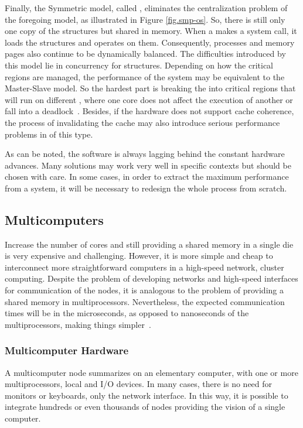 			Finally, the Symmetric model, called \smp, eliminates the centralization
			problem of the foregoing model, as illustrated in Figure \ref{fig.smp-os}.
			So, there is still only one copy of the \os structures but shared in memory.
			When a \cpu makes a system call, it loads the structures and operates on them.
			Consequently, processes and memory pages also continue to be dynamically balanced.
			The difficulties introduced by this model lie in concurrency for \os structures.
			Depending on how the critical regions are managed, the performance of the system
			may be equivalent to the Master-Slave model. So the hardest part is breaking the
			\os into critical regions that will run on different \cpus, where one core does
			not affect the execution of another or fall into a deadlock~\cite{tanenbaum:4ed}.
			Besides, if the hardware does not support cache coherence, the process of
			invalidating the cache may also introduce serious performance problems in \oses of this type.

			As can be noted, the software is always lagging behind the constant hardware advances.
			Many solutions may work very well in specific contexts but should be chosen with care.
			In some cases, in order to extract the maximum performance from a system, it will be
			necessary to redesign the whole process from scratch.

	\subsection{Multicomputers}
	\label{sec.multicomputers}

		Increase the number of cores and still providing a shared memory in a
		single die is very expensive and challenging.
		However, it is more simple and cheap to interconnect more straightforward
		computers in a high-speed network, \eg cluster computing.
		Despite the problem of developing networks and high-speed interfaces
		for communication of the nodes, it is analogous to the problem of
		providing a shared memory in multiprocessors.
		Nevertheless, the expected communication times will be in the
		microseconds, as opposed to nanoseconds of the multiprocessors,
		making things simpler~\cite{tanenbaum:4ed}.

			\subsubsection{Multicomputer Hardware}
			\label{sec.multicomputers-hw}

				A multicomputer node summarizes on an elementary computer, with one or
				more multiprocessors, local \ram and I/O devices.
				In many cases, there is no need for monitors or keyboards, only the
				network interface.
				In this way, it is possible to integrate hundreds or even thousands
				of nodes providing the vision of a single computer.

